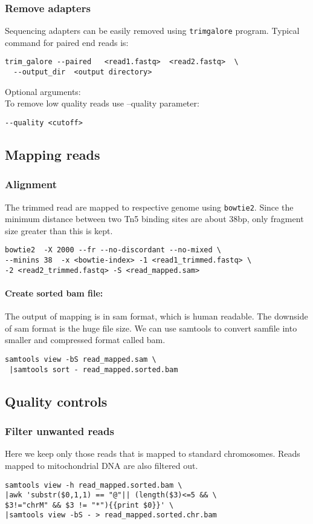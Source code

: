 \documentclass[10pt]{article}
\newcommand{\prog}[1]{\texttt{#1}}
\begin{document}
\subsubsection{Remove adapters} Sequencing adapters can be easily removed using  \prog{trimgalore} program. Typical command for paired end reads is:\\
\begin{verbatim}
trim_galore --paired   <read1.fastq>  <read2.fastq>  \
  --output_dir  <output directory>
\end{verbatim}
Optional arguments:\\
To remove low quality reads use --quality parameter:
\begin{verbatim}
--quality <cutoff>
\end{verbatim}
\subsection{Mapping reads}
\subsubsection{Alignment}
The trimmed read are mapped to respective genome using \prog{bowtie2}. Since the minimum distance between two Tn5 binding sites are about 38bp, only fragment size greater than this is kept.
\begin{verbatim}
bowtie2  -X 2000 --fr --no-discordant --no-mixed \
--minins 38  -x <bowtie-index> -1 <read1_trimmed.fastq> \
-2 <read2_trimmed.fastq> -S <read_mapped.sam>
\end{verbatim}
\paragraph{Create sorted bam file:} The output of mapping is in sam format, which is human readable. The downside of sam format is the huge file size. We can use samtools to convert samfile into smaller and compressed format called bam.
\begin{verbatim}
samtools view -bS read_mapped.sam \
 |samtools sort - read_mapped.sorted.bam
\end{verbatim}
\subsection{Quality controls}
\subsubsection{Filter unwanted reads} Here we keep only those reads that is mapped to standard chromosomes. Reads mapped to mitochondrial DNA are also filtered out.
\begin{verbatim}
samtools view -h read_mapped.sorted.bam \
|awk 'substr($0,1,1) == "@"|| (length($3)<=5 && \
$3!="chrM" && $3 != "*"){{print $0}}' \
|samtools view -bS - > read_mapped.sorted.chr.bam
\end{verbatim}
\end{document}
